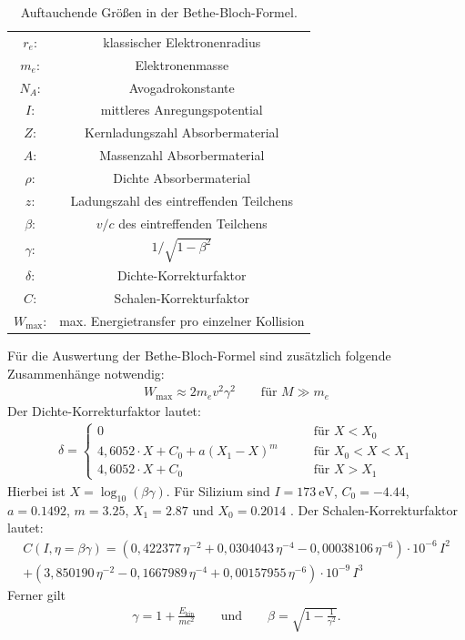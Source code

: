 \begin{table}[h]
	\centering
	\caption{Auftauchende Größen in der Bethe-Bloch-Formel.}
	\begin{tabular}{cc}
		$r_e$: & klassischer Elektronenradius \\
		$m_e$: & Elektronenmasse \\
		$N_A$: & Avogadrokonstante \\
		$I$:  & mittleres Anregungspotential \\
		$Z$:  & Kernladungszahl Absorbermaterial \\
		$A$:  & Massenzahl Absorbermaterial \\
		$\rho$: & Dichte Absorbermaterial \\
		$z$:  & Ladungszahl des eintreffenden Teilchens \\
		$\beta$: & $v/c$ des eintreffenden Teilchens \\
		$\gamma$: & $1/\sqrt{1-\beta^2}$ \\
		$\delta$: & Dichte-Korrekturfaktor \\
		$C$:  & Schalen-Korrekturfaktor \\
		$W_\text{max}$: & max. Energietransfer pro einzelner Kollision \\
	\end{tabular}%
	\label{tab:bethebloch}%
\end{table}%

Für die Auswertung der Bethe-Bloch-Formel sind zusätzlich folgende Zusammenhänge notwendig:
\begin{align}
	W_\text{max}\approx 2m_ev^2\gamma^2\qquad\text{für }M\gg m_e
\end{align}
Der Dichte-Korrekturfaktor lautet:
\begin{align}
	\delta=\begin{cases}
	0 &\qquad\text{für }X<X_0\\
	4,6052\cdot X + C_0 + a(X_1-X)^m &\qquad\text{für }X_0<X<X_1\\
	4,6052\cdot X + C_0  &\qquad\text{für }X>X_1
	\end{cases}
\end{align}
Hierbei ist $X=\log_{10}(\beta \gamma)$.
Für Silizium sind $I=\SI{173}{\electronvolt}$, $C_0=\num{-4,44}$, $a=\num{0,1492}$, $m=\num{3,25}$, $X_1=\num{2,87}$ und $X_0=\num{0,2014}$ \cite{bethebloch}.
Der  Schalen-Korrekturfaktor lautet:
\begin{align}
	C(I,\eta=\beta\gamma)=(0,422377\,\eta^{-2}+0,0304043\,\eta^{-4}-0,00038106\,\eta^{-6})\cdot 10^{-6}\,I^2 \nonumber\\
	+(3,850190\,\eta^{-2}-0,1667989\,\eta^{-4}+0,00157955\,\eta^{-6})\cdot 10^{-9}\,I^3
\end{align}
Ferner gilt
\begin{align}
	\gamma = 1 + \frac{E_\text{kin}}{mc^2}\qquad\text{und}\qquad\beta=\sqrt{1-\frac{1}{\gamma^2}}.
\end{align}

